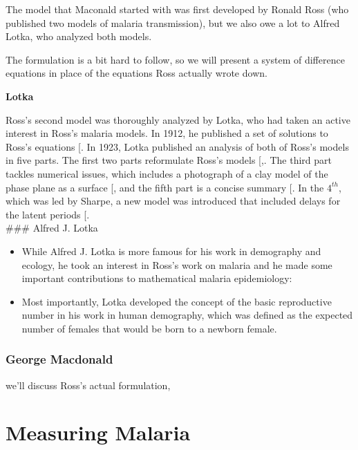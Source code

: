 \documentclass[
]{book}
\begin{document}
The model that Maconald started with was first developed by
Ronald Ross (who published two models of malaria transmission), but we also owe a lot to Alfred Lotka, who analyzed both models.

The formulation is a bit hard to follow, so we will present a system of difference equations in place of the equations Ross actually wrote down.

\textbf{Lotka}

Ross's second model was thoroughly analyzed by Lotka, who had taken an active interest in Ross's malaria models. In 1912, he published a set of solutions to Ross's equations {[}\citeproc{ref-LotkaAJ1912Nature}{50}{]}. In 1923, Lotka published an analysis of both of Ross's models in five parts. The first two parts reformulate Ross's models {[},\citeproc{ref-LotkaAJ1923part2}{35}{]}. The third part tackles numerical issues, which includes a photograph of a clay model of the phase plane as a surface {[}\citeproc{ref-LotkaAJ1923part3}{36}{]}, and the fifth part is a concise summary {[}\citeproc{ref-LotkaAJ1923part5}{37}{]}. In the \(4^{th}\), which was led by Sharpe, a new model was introduced that included delays for the latent periods {[}\citeproc{ref-LotkaAJ1923part4}{63}{]}.\\
\#\#\# Alfred J. Lotka

\begin{itemize}
\item
  While Alfred J. Lotka is more famous for his work in demography and ecology, he took an interest in Ross's work on malaria and he made some important contributions to mathematical malaria epidemiology:
\item
  Most importantly, Lotka developed the concept of the basic reproductive number in his work in human demography, which was defined as the expected number of females that would be born to a newborn female.
\end{itemize}

\subsection{George Macdonald}\label{george-macdonald}

we'll discuss Ross's actual formulation,

\chapter{Measuring Malaria}\label{measuring-malaria}
\end{document}
